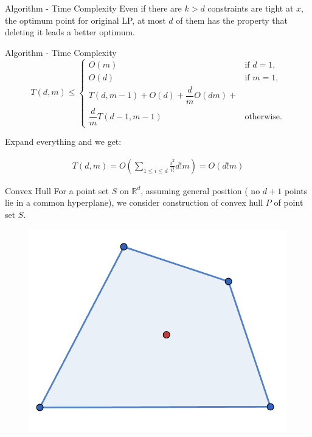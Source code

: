 \documentclass{beamer}
\begin{document}
\begin{frame}{Algorithm - Time Complexity}
	Even if there are $k > d$ constraints are tight at $x$, the optimum point for original LP, at most $d$ of them
	has the property that deleting it leads a better optimum.

	\vspace{\baselineskip}

\end{frame}
\begin{frame}{Algorithm - Time Complexity}
	\[
		T(d, m) \le
		\begin{cases}
			O(m)                         & \text{if } d = 1, \\
			O(d)                         & \text{if } m = 1, \\
			T(d, m - 1) + O(d) + \dfrac{d}{m} O(dm) +        \\
			\dfrac{d}{m} T(d - 1, m - 1) & \text{otherwise}.
		\end{cases}
	\]

	Expand everything and we get:

	\begin{align*}
		T(d, m) = O(\sum_{1\le i \le d} \frac{i^2}{i!} d! m) = O(d! m)
	\end{align*}

\end{frame}

\begin{frame}{Convex Hull}
	For a point set $S$ on $\mathbb{R}^d$, assuming general position ( no $d + 1$ points lie in a common hyperplane), we consider
	construction of convex hull $P$ of point set $S$.

	\vspace{\baselineskip}


	\begin{figure}[h]
		\includegraphics[width=0.4\linewidth]{pics/not_4hole.png}
	\end{figure}
\end{frame}
\end{document}
